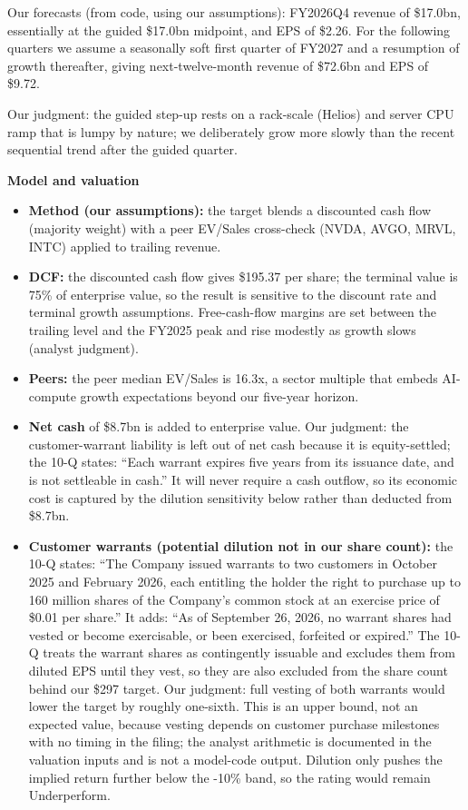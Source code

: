 \documentclass[a4paper,10pt]{article}
\begin{document}
Our forecasts (from code, using our assumptions): FY2026Q4 revenue of \$17.0bn, essentially at the guided \$17.0bn midpoint, and EPS of \$2.26. For the following quarters we assume a seasonally soft first quarter of FY2027 and a resumption of growth thereafter, giving next-twelve-month revenue of \$72.6bn and EPS of \$9.72.

Our judgment: the guided step-up rests on a rack-scale (Helios) and server CPU ramp that is lumpy by nature; we deliberately grow more slowly than the recent sequential trend after the guided quarter.

\par\smallskip\textbf{\color{MemoBlue}Model and valuation}\par

\begin{itemize}\setlength{\itemsep}{1pt}
\item \textbf{Method (our assumptions):} the target blends a discounted cash flow (majority weight) with a peer EV/Sales cross-check (NVDA, AVGO, MRVL, INTC) applied to trailing revenue.
\item \textbf{DCF:} the discounted cash flow gives \$195.37 per share; the terminal value is 75\% of enterprise value, so the result is sensitive to the discount rate and terminal growth assumptions. Free-cash-flow margins are set between the trailing level and the FY2025 peak and rise modestly as growth slows (analyst judgment).
\item \textbf{Peers:} the peer median EV/Sales is 16.3x, a sector multiple that embeds AI-compute growth expectations beyond our five-year horizon.
\item \textbf{Net cash} of \$8.7bn is added to enterprise value. Our judgment: the customer-warrant liability is left out of net cash because it is equity-settled; the 10-Q states: “Each warrant expires five years from its issuance date, and is not settleable in cash.” It will never require a cash outflow, so its economic cost is captured by the dilution sensitivity below rather than deducted from \$8.7bn.
\item \textbf{Customer warrants (potential dilution not in our share count):} the 10-Q states: “The Company issued warrants to two customers in October 2025 and February 2026, each entitling the holder the right to purchase up to 160 million shares of the Company’s common stock at an exercise price of \$0.01 per share.” It adds: “As of September 26, 2026, no warrant shares had vested or become exercisable, or been exercised, forfeited or expired.” The 10-Q treats the warrant shares as contingently issuable and excludes them from diluted EPS until they vest, so they are also excluded from the share count behind our \$297 target. Our judgment: full vesting of both warrants would lower the target by roughly one-sixth. This is an upper bound, not an expected value, because vesting depends on customer purchase milestones with no timing in the filing; the analyst arithmetic is documented in the valuation inputs and is not a model-code output. Dilution only pushes the implied return further below the -10\% band, so the rating would remain Underperform.

\end{itemize}
\end{document}
